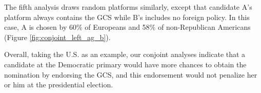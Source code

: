 The fifth analysis draws random platforms similarly, except that candidate A's platform always contains the GCS while B's includes no foreign policy. In this case, A is chosen by 60\% of Europeans %
and 58\% of non-Republican Americans (Figure \ref{fig:conjoint_left_ag_b}). %

Overall, taking the U.S. as an example, our conjoint analyses indicate that a candidate at the Democratic primary would have more chances to obtain the nomination by endorsing the GCS, and this endorsement would not penalize her or him at the presidential election. 


